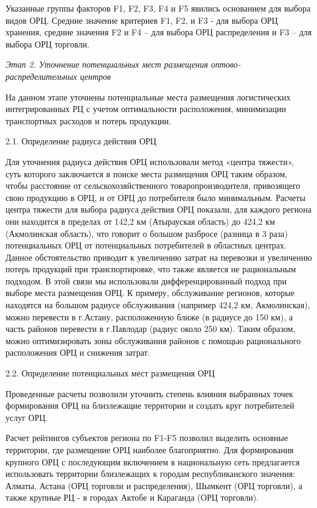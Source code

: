 Указанные группы факторов F1, F2, F3, F4 и F5 явились основанием для
выбора видов ОРЦ. Средние значение критериев F1, F2, и F3 - для выбора
ОРЦ хранения, средние значения F2 и F4 -- для выбора ОРЦ распределения и
F3 -- для выбора ОРЦ торговли.

\emph{Этап 2. Уточнение потенциальных мест размещения
оптово-распределительных центров}

На данном этапе уточнены потенциальные места размещения логистических
интегрированных РЦ с учетом оптимальности расположения, минимизации
транспортных расходов и потерь продукции.

2.1. Определение радиуса действия ОРЦ

Для уточнения радиуса действия ОРЦ использовали метод «центра тяжести»,
суть которого заключается в поиске места размещения ОРЦ таким образом,
чтобы расстояние от сельскохозяйственного товаропроизводителя,
привозящего свою продукцию в ОРЦ, и от ОРЦ до потребителя было
минимальным. Расчеты центра тяжести для выбора радиуса действия ОРЦ
показали, для каждого региона они находится в пределах от 142,2 км
(Атырауская область) до 424,2 км (Акмолинская область), что говорит о
большом разбросе (разница в 3 раза) потенциальных ОРЦ от потенциальных
потребителей в областных центрах. Данное обстоятельство приводит к
увеличению затрат на перевозки и увеличению потерь продукций при
транспортировке, что также является не рациональным подходом. В этой
связи мы использовали дифференцированный подход при выборе места
размещения ОРЦ. К примеру, обслуживание регионов, которые находятся на
большом радиусе обслуживания (например 424,2 км, Акмолинская), можно
перевести в г.Астану, расположенную ближе (в радиусе до 150 км), а часть
районов перевести в г.Павлодар (радиус около 250 км). Таким образом,
можно оптимизировать зоны обслуживания районов с помощью рационального
расположения ОРЦ и снижения затрат.

2.2. Определение потенциальных мест размещения ОРЦ

Проведенные расчеты позволили уточнить степень влияния выбранных точек
формирования ОРЦ на близлежащие территории и создать круг потребителей
услуг ОРЦ.

Расчет рейтингов субъектов региона по F1-F5 позволил выделить основные
территории, где размещение ОРЦ наиболее благоприятно. Для формирования
крупного ОРЦ с последующим включением в национальную сеть предлагается
использовать территории близлежащих к городам республиканского значения:
Алматы, Астана (ОРЦ торговли и распределения), Шымкент (ОРЦ торговли), а
также крупные РЦ - в городах Актобе и Караганда (ОРЦ торговли).

